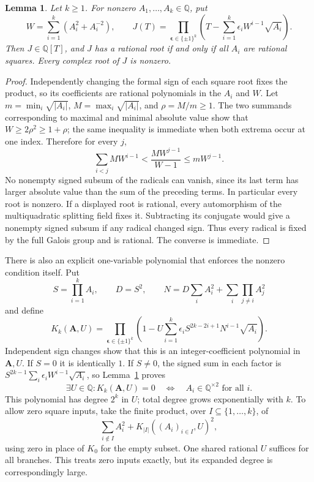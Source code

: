 \documentclass[11pt]{article}
\newtheorem{lemma}[theorem]{Lemma}
\theoremstyle{definition}
\begin{document}
\begin{lemma}\label{lem:additive-square-separation}
Let $k\ge1$. For nonzero $A_1,\ldots,A_k\in\mathbb Q$, put
\[
 W=\sum_{i=1}^k(A_i^2+A_i^{-2}),\qquad
 J(T)=\prod_{\boldsymbol\epsilon\in\{\pm1\}^k}
 \left(T-\sum_{i=1}^k\epsilon_i W^{i-1}\sqrt{A_i}\right).
\]
Then $J\in\mathbb Q[T]$, and $J$ has a rational root if and only if
all $A_i$ are rational squares. Every complex root of $J$ is nonzero.
\end{lemma}
\begin{proof}
Independently changing the formal sign of each square root fixes the
product, so its coefficients are rational polynomials in the $A_i$ and
$W$. Let
$m=\min_i\sqrt{|A_i|}$, $M=\max_i\sqrt{|A_i|}$, and $\rho=M/m\ge1$.
The two summands corresponding to maximal and minimal absolute value
show that $W\ge2\rho^2\ge1+\rho$; the same inequality is immediate
when both extrema occur at one index. Therefore for every $j$,
\[
 \sum_{i<j}M W^{i-1}<\frac{M W^{j-1}}{W-1}
 \le mW^{j-1}.
\]
No nonempty signed subsum of the radicals can vanish, since its last
term has larger absolute value than the sum of the preceding terms.
In particular every root is nonzero. If a displayed root is rational,
every automorphism of the multiquadratic splitting field fixes it.
Subtracting its conjugate would give a nonempty signed subsum if any
radical changed sign. Thus every radical is fixed by the full Galois
group and is rational. The converse is immediate.
\end{proof}

There is also an explicit one-variable polynomial that enforces the
nonzero condition itself. Put
\[
 S=\prod_{i=1}^k A_i,\qquad D=S^2,\qquad
 N=D\sum_i A_i^2+\sum_i\prod_{j\ne i}A_j^2
\]
and define
\[
 K_k(\mathbf A,U)=\prod_{\boldsymbol\epsilon\in\{\pm1\}^k}
 \left(1-U\sum_{i=1}^k\epsilon_i
 S^{2k-2i+1}N^{i-1}\sqrt{A_i}\right).
\]
Independent sign changes show that this is an integer-coefficient
polynomial in $\mathbf A,U$. If $S=0$ it is identically $1$.
If $S\ne0$, the signed sum in each factor is
$S^{2k-1}\sum_i\epsilon_iW^{i-1}\sqrt{A_i}$, so
Lemma~\ref{lem:additive-square-separation} proves
\[
 \exists U\in\mathbb Q:K_k(\mathbf A,U)=0
 \quad\Longleftrightarrow\quad
 A_i\in\mathbb Q^{\times2}\text{ for all }i.
\]
This polynomial has degree $2^k$ in $U$; total degree grows
exponentially with $k$. To allow zero square inputs, take the finite
product, over $I\subseteq\{1,\ldots,k\}$, of
\[
 \sum_{i\notin I}A_i^2+K_{|I|}((A_i)_{i\in I},U)^2,
\]
using zero in place of $K_0$ for the empty subset. One shared rational
$U$ suffices for all branches. This treats zero inputs exactly, but its
expanded degree is correspondingly large.
\end{document}
